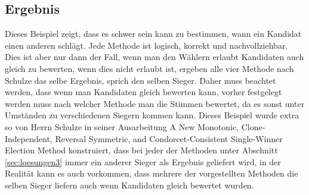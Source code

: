 \subsection{Ergebnis} 
\label{sec:ergebnis3}
Dieses Beispiel zeigt, dass es schwer sein kann zu bestimmen, wann ein Kandidat einen anderen schlägt. Jede Methode ist logisch, korrekt und nachvollziehbar. Dies ist aber nur dann der Fall, wenn man den Wählern erlaubt Kandidaten auch gleich zu bewerten, wenn dies nicht erlaubt ist, ergeben alle vier Methode nach Schulze das selbe Ergebnis, sprich den selben Sieger. Daher muss beachtet werden, dass wenn man Kandidaten gleich bewerten kann, vorher festgelegt werden muss nach welcher Methode man die Stimmen bewertet, da es sonst unter Umständen zu verschiedenen Siegern kommen kann. Dieses Beispiel wurde extra so von Herrn Schulze in seiner Ausarbeitung \glqq A New Monotonic, Clone-Independent,
Reversal Symmetric, and Condorcet-Consistent
Single-Winner Election Method\grqq{} \citep{Schulze2017} konstruiert, dass bei jeder der Methoden unter Abschnitt \ref{sec:loesungen3} immer ein anderer Sieger als Ergebnis geliefert wird, in der Realität kann es auch vorkommen, dass mehrere der vorgestellten Methoden die selben Sieger liefern auch wenn Kandidaten gleich bewertet wurden.
\newpage